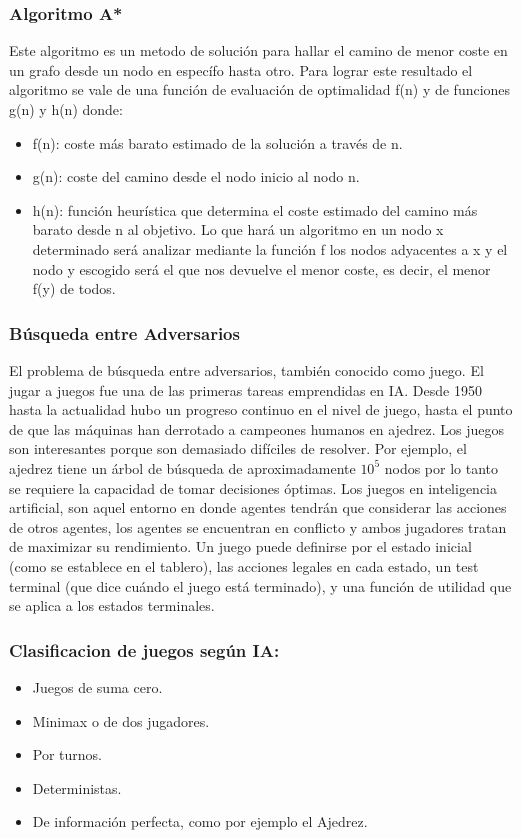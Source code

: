 \documentclass[a4paper]{article}
\begin{document}
\subsubsection*{Algoritmo A*}
Este algoritmo es un metodo de solución para hallar el camino de menor coste en un grafo desde un nodo en específo hasta otro. Para lograr este resultado el algoritmo se vale de una función de evaluación de optimalidad f(n) y de funciones g(n) y h(n) donde:
\begin{itemize}
\item f(n): coste más barato estimado de la solución a través de n.
\item g(n): coste del camino desde el nodo inicio al nodo n.
\item h(n): función heurística que determina el coste estimado del camino más barato desde n al objetivo. Lo que hará un algoritmo en un nodo x determinado será analizar mediante la función f los nodos adyacentes a x y el nodo y escogido será el que nos devuelve el menor coste, es decir, el menor f(y) de todos.
\end{itemize}


\subsubsection{B\'usqueda entre Adversarios}
El problema de búsqueda entre adversarios, también conocido como juego. El jugar a juegos fue una de las primeras tareas emprendidas en IA. Desde 1950 hasta la actualidad hubo un progreso continuo en el nivel de juego, hasta el punto de que las máquinas han derrotado a campeones humanos en ajedrez. Los juegos son interesantes porque son demasiado difíciles de resolver. Por ejemplo, el ajedrez tiene un árbol de búsqueda de aproximadamente $10^5$ nodos por lo tanto se requiere la capacidad de tomar decisiones óptimas.
Los juegos en inteligencia artificial, son aquel entorno en donde agentes tendrán que considerar las acciones de otros agentes, los agentes se encuentran en conflicto y ambos jugadores tratan de maximizar su rendimiento. Un juego puede definirse por el estado inicial (como se establece en el tablero), las acciones legales en cada estado, un test terminal (que dice cuándo el juego está terminado), y una función de utilidad que se aplica a los estados terminales.

\subsubsection*{Clasificacion de juegos seg\'un IA:}
\begin{itemize}
\item Juegos de suma cero.
\item Minimax o de dos jugadores.
\item Por turnos.
\item Deterministas.
\item De información perfecta, como por ejemplo el Ajedrez. 
\end{itemize}
\end{document}
